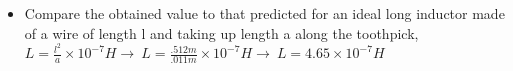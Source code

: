 \documentclass{article}
\def\F#1{\(#1\)}
\begin{document}
\begin{itemize}
  \item Compare the obtained value to that predicted for an ideal long inductor made of a wire of length l and taking up length a along the toothpick, \F{L=\frac{l^2}{a}\times{10}^{-7}H\rightarrow~L=\frac{.512 m}{.011 m}\times{10}^{-7}H\rightarrow~L=4.65\times{10}^{-7}H}
\end{itemize}
\end{document}
